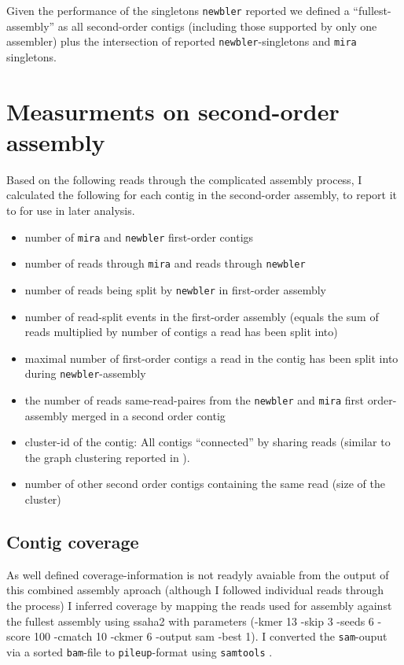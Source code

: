 Given the performance of the singletons \texttt{newbler} reported we
defined a ``fullest-assembly'' as all second-order contigs (including
those supported by only one assembler) plus the intersection of
reported \texttt{newbler}-singletons and \texttt{mira} singletons.

\section{Measurments on second-order assembly}

Based on the following reads through the complicated assembly process,
I calculated the following for each contig in the second-order
assembly, to report it to for use in later analysis.

\begin{itemize}
\item number of \texttt{mira} and \texttt{newbler} first-order contigs
\item number of reads through \texttt{mira} and reads through \texttt{newbler}
\item number of reads being split by \texttt{newbler} in first-order
  assembly 
\item number of read-split events in the first-order assembly (equals
  the sum of reads multiplied by number of contigs a read has been
  split into)
\item maximal number of first-order contigs a read in the contig has
  been split into during \texttt{newbler}-assembly 
\item the number of reads same-read-paires from the \texttt{newbler}
  and \texttt{mira} first order-assembly merged in a second order
  contig
\item cluster-id of the contig: All contigs ``connected'' by sharing
  reads (similar to the graph clustering reported in
  \cite{pmid21138572}). 
\item number of other second order contigs containing the same read
  (size of the cluster)
\end{itemize}


\subsection{Contig coverage}

As well defined coverage-information is not readyly avaiable from the
output of this combined assembly aproach (although I followed
individual reads through the process) I inferred coverage by mapping
the reads used for assembly against the fullest assembly using ssaha2
\cite{pmid11591649} with parameters (-kmer 13 -skip 3 -seeds 6 -score
100 -cmatch 10 -ckmer 6 -output sam -best 1). I converted the
\texttt{sam}-ouput via a sorted \texttt{bam}-file to
\texttt{pileup}-format using \texttt{samtools}
\cite{journals/bioinformatics/LiHWFRHMAD09}.

